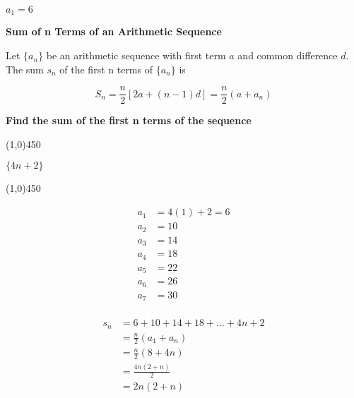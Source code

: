 \documentclass{report}
\begin{document}
$a_1 = 6$
\newpage
\noindent
\begin{LARGE}
	\textbf{Sum of n Terms of an Arithmetic Sequence}
\end{LARGE}
\bigbreak \noindent
\begin{large}
	Let $\{a_n\}$ be an arithmetic sequence with first term $a$ and common difference $d$. The sum $s_n$ of the first n terms of $\{a_n\}$ is 
	\vspace{3mm}

	$$S_n=\frac{n}{2}[2 a+(n-1) d]=\frac{n}{2}\left(a+a_n\right)$$
\end{large}
\bigbreak \noindent \bigbreak \noindent \bigbreak \noindent
\begin{large}
\begin{center}
	\textbf{Find the sum of the first n terms of the sequence} 
\end{center}  
\end{large}

\line(1,0){450}

\begin{center}
\begin{large}
	$\{4n + 2\}$
\end{large}
\end{center}

\line(1,0){450}
\bigbreak \noindent

\begin{minipage}[t]{0.45\textwidth}
    \begin{align*}
        a_1 &= 4(1) + 2 = 6 \\
        a_2 &= 10 \\
        a_3 &= 14 \\
        a_4 &= 18 \\
		a_5 &= 22 \\
		a_6 &= 26 \\
		a_7 &= 30 \\
    \end{align*}
\end{minipage}\hfill%
\begin{minipage}[t]{0.45\textwidth}
    \begin{align*}
        s_n &= 6+10+14+18+\ldots+4n+2 \\
        &= \frac{n}{2}(a_1+a_n) \\
        &= \frac{n}{2}(8+4n) \\
        &= \frac{4n(2+n)}{2} \\
		&= \boxed{2n(2+n)} \\
    \end{align*}
\end{minipage}
\bigbreak \noindent \bigbreak \noindent \bigbreak \noindent
\end{document}
